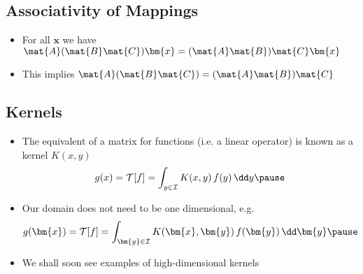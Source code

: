 
\begin{slide}
  \section[-1]{Associativity of Mappings}

  \pb\pause{}
  \begin{center}
    \pause
  \end{center}
  \begin{itemize}
  \item For all $\bm{x}$ we have $\mat{A}(\mat{B}\mat{C})\bm{x} =
    (\mat{A}\mat{B})\mat{C}\bm{x}$\pause
  \item This implies $\mat{A}(\mat{B}\mat{C}) = (\mat{A}\mat{B})\mat{C}$\pause
  \end{itemize}
\end{slide}




\begin{slide}
\section{Kernels}

\begin{PauseHighLight}
  \begin{itemize}
  \item The equivalent of a matrix for functions (i.e. a linear
    operator) is known as a kernel $K(x,y)$
    \begin{align*}
      g(x) = \mathcal{T}[f] = \int_{y\in\mathcal{I}} K(x,y)\, f(y) \,
      \dd y\pause
    \end{align*}
  \item Our domain does not need to be one dimensional, e.g.
    \begin{align*}
      g(\bm{x}) = \mathcal{T}[f] = \int_{\bm{y}\in\mathcal{I}}
      K(\bm{x},\bm{y})\, f(\bm{y}) \, \dd \bm{y}\pause
    \end{align*}
  \item We shall soon see examples of high-dimensional kernels\pause
  \end{itemize}
\end{PauseHighLight}

\end{slide}

